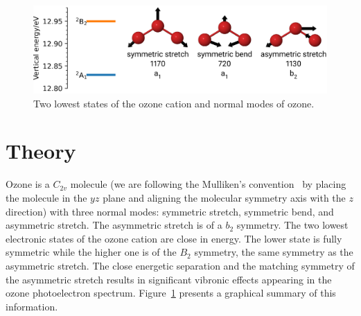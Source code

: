 \documentclass[
12pt,
a4paper,
prb,
superscriptaddress,
tightenlines,  %
]{revtex4}
\begin{document}
\begin{figure}
    \includegraphics[width = 16 cm]{./figures/ozone_intro}
    \caption{ 
        Two lowest states of the ozone cation and normal modes of ozone.
    }
    \label{fig:ozone_intro}
\end{figure}

\section{Theory}

Ozone is a $C_{2v}$ molecule (we are following the Mulliken's
convention~\cite{Mulliken:55:symnot} by placing the molecule in the $yz$ plane
and aligning the molecular symmetry axis with the $z$ direction) with three
normal modes: symmetric stretch, symmetric bend, and asymmetric stretch.  The
asymmetric stretch is of a $b_2$ symmetry. The two lowest electronic states of
the ozone cation are close in energy. The lower state is fully symmetric while
the higher one is of the $B_2$ symmetry, the same symmetry as the asymmetric
stretch. The close energetic separation and the matching symmetry of the
asymmetric stretch results in significant vibronic effects appearing in the
ozone photoelectron spectrum.  Figure~\ref{fig:ozone_intro} presents a
graphical summary of this information.
\end{document}
